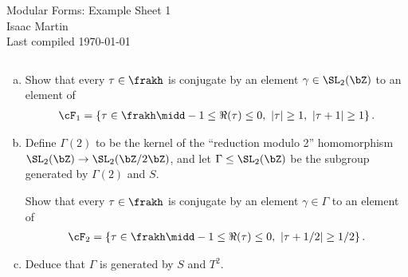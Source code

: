 


\pagestyle{empty}
	\LARGE
\begin{center}
	Modular Forms: Example Sheet 1 \\
	\Large
	Isaac Martin \\
    Last compiled \today
\end{center}
\normalsize
\vspace{-2mm}
\hru
\begin{homework}[e]
	\prob
	\prob
	\prob $ $ 
	\begin{enumerate}[(a)]
		\item Show that every $\tau \in \frakh$ is conjugate by an element $\gamma \in \SL_2(\bZ)$ to an element of
			\begin{align*}
				\cF_1 = \left\{\tau \in \frakh \midd -1 \leq \Re(\tau) \leq 0, ~|\tau| \geq 1,~ |\tau + 1| \geq 1 \right\}.
			\end{align*}
		\item Define $\Gamma(2)$ to be the kernel of the ``reduction modulo 2'' homomorphism $\SL_2(\bZ) \to \SL_2(\bZ/2\bZ)$, and let $\Gamma \leq \SL_2(\bZ)$ be the subgroup generated by $\Gamma(2)$ and $S$. 

		Show that every $\tau \in \frakh$ is conjugate by an element $\gamma \in \Gamma$ to an element of
		 \begin{align*}
			\cF_2 = \left\{ \tau \in \frakh \midd -1 \leq \Re(\tau) \leq 0, ~ |\tau + 1/2| \geq 1/2\right\} .
		\end{align*}
	    \item Deduce that $\Gamma$ is generated by $S$ and $T^2$.
	\end{enumerate}
	\begin{prf}
		
	\end{prf}
\end{homework}


